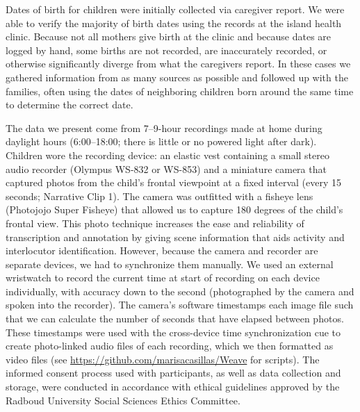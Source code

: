 \documentclass[
  english,
  ,man,floatsintext]{apa6}
\begin{document}
Dates of birth for children were initially collected via caregiver report. We were able to verify the majority of birth dates using the records at the island health clinic. Because not all mothers give birth at the clinic and because dates are logged by hand, some births are not recorded, are inaccurately recorded, or otherwise significantly diverge from what the caregivers report. In these cases we gathered information from as many sources as possible and followed up with the families, often using the dates of neighboring children born around the same time to determine the correct date.

The data we present come from 7--9-hour recordings made at home during daylight hours (6:00--18:00; there is little or no powered light after dark). Children wore the recording device: an elastic vest containing a small stereo audio recorder (Olympus WS-832 or WS-853) and a miniature camera that captured photos from the child's frontal viewpoint at a fixed interval (every 15 seconds; Narrative Clip 1). The camera was outfitted with a fisheye lens (Photojojo Super Fisheye) that allowed us to capture 180 degrees of the child's frontal view. This photo technique increases the ease and reliability of transcription and annotation by giving scene information that aids activity and interlocutor identification. However, because the camera and recorder are separate devices, we had to synchronize them manually. We used an external wristwatch to record the current time at start of recording on each device individually, with accuracy down to the second (photographed by the camera and spoken into the recorder). The camera's software timestamps each image file such that we can calculate the number of seconds that have elapsed between photos. These timestamps were used with the cross-device time synchronization cue to create photo-linked audio files of each recording, which we then formatted as video files (see \url{https://github.com/marisacasillas/Weave} for scripts). The informed consent process used with participants, as well as data collection and storage, were conducted in accordance with ethical guidelines approved by the Radboud University Social Sciences Ethics Committee.
\end{document}
